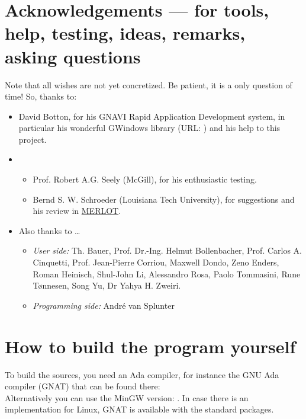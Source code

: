 \documentclass[11pt,a4paper]{article}
\begin{document}
\section{Acknowledgements --- for tools, help, testing, ideas,
remarks, asking questions}
%
Note that all wishes are not yet concretized. Be patient, it is a
only question of time! So, thanks to:
%
\begin{itemize}
  \item David Botton, for his GNAVI Rapid Application Development system, in
        particular his wonderful GWindows library (URL:
        )
        and his help to this project.
  \item
  \begin{itemize}
    \item
        Prof. Robert A.G. Seely (McGill), for his enthusiastic testing.
    \item
        Bernd S. W. Schroeder (Louisiana Tech University), for suggestions
        and his review in \href{http://www.merlot.org/}{MERLOT}.
  \end{itemize}
  \item Also thanks to \ldots
    \begin{itemize}
    \item {\em User side:}
        Th. Bauer,
        Prof. Dr.-Ing. Helmut Bollenbacher,
        Prof. Carlos A. Cinquetti,
        Prof. Jean-Pierre Corriou,
        Maxwell Dondo,
        Zeno Enders,
        Roman Heinisch,
        Shul-John Li,
        Alessandro Rosa,
        Paolo Tommasini,
        Rune T\o nnesen,
        Song Yu,
        Dr Yahya H. Zweiri.
    \item {\em Programming side:}
        Andr\'e van Splunter
  \end{itemize}
\end{itemize}
%
\section{How to build the program yourself}
%

To build the sources, you need an Ada compiler, for instance the
GNU Ada compiler (GNAT) that can be found there:
   \\
Alternatively you can use the MinGW version: .
In case there is an implementation for Linux, GNAT is available with
the standard packages.
  
\end{document}
